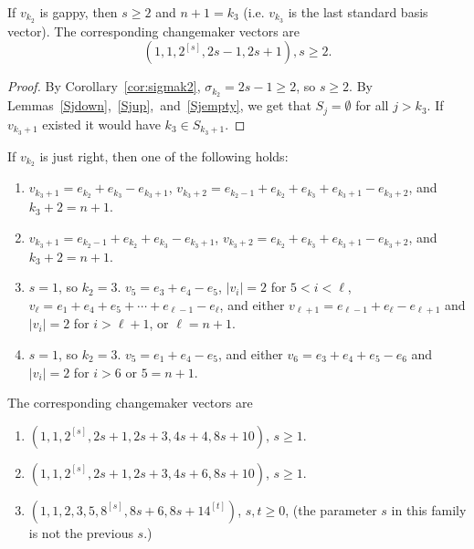 \begin{prop}\label{example}
If $v_{k_2}$ is gappy, then $s\ge2$ and $n+1 = k_3$ (i.e. $v_{k_3}$ is the last standard basis vector). The corresponding changemaker vectors are 
\[(1,1,2^{[s]},2s-1,2s+1), s\ge2.\]
\end{prop}
\begin{proof}
By Corollary~\ref{cor:sigmak2}, $\sigma_{k_2}=2s-1\ge2$, so $s\ge2$.
By Lemmas~\ref{Sjdown},~\ref{Sjup},~and~\ref{Sjempty}, we get that $S_{j} = \emptyset$ for all $j > k_3$. If $v_{k_3 +1}$ existed it would have $k_3 \in S_{k_3 + 1}$. 
\end{proof}

\begin{prop}\label{1k2>2}
If $v_{k_2}$ is just right, then one of the following holds:
\begin{enumerate}
\item $v_{k_3 + 1} = e_{k_2} + e_{k_3} - e_{k_3 + 1}$, $v_{k_3 + 2} = e_{k_2 - 1} + e_{k_2} + e_{k_3} + e_{k_3 + 1} - e_{k_3 + 2}$, and $k_3 + 2 = n+1$.
\item $v_{k_3 + 1} = e_{k_2 - 1} + e_{k_2} + e_{k_3} - e_{k_3 + 1}$, $v_{k_3 + 2} = e_{k_2} + e_{k_3} + e_{k_3 + 1} - e_{k_3 + 2}$, and $k_3 + 2 = n+1$.
\item $s = 1$, so $k_2 = 3$. $v_5 = e_3 + e_4 - e_5$, $|v_i| = 2$ for $5 < i < \ell$, $v_\ell = e_1 + e_4 + e_5 + \cdots + e_{\ell-1} - e_\ell$, and either $v_{\ell+1} = e_{\ell-1} + e_\ell - e_{\ell+1}$ and $|v_i| = 2$ for $i > \ell+1$, or $\ell = n+1$.
\item $s = 1$, so $k_2 = 3$. $v_5 = e_1 + e_4 - e_5$, and either $v_6 = e_3 + e_4 + e_5 - e_6$ and $|v_i| = 2$ for $i > 6$ or $5 = n+1$. 
\end{enumerate}
The corresponding changemaker vectors are
\begin{enumerate}
\item $(1,1,2^{[s]},2s+1,2s+3,4s+4,8s+10)$, $s\ge1$.
\item $(1,1,2^{[s]},2s+1,2s+3,4s+6,8s+10)$, $s\ge1$.
\item $(1,1,2,3,5,8^{[s]},8s+6,8s+14^{[t]})$, $s,t\ge0$, (the parameter $s$ in this family is not the previous $s$.)
\end{enumerate}
\end{prop}
